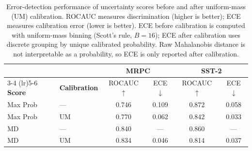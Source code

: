 \begin{table}[t]
\centering
\begin{tabular}{llcccc}
\toprule
 & & \multicolumn{2}{c}{\textbf{MRPC}} & \multicolumn{2}{c}{\textbf{SST-2 }} \\
\cmidrule(lr){3-4} \cmidrule(lr){5-6}
\textbf{Score} & \textbf{Calibration} & ROCAUC $\uparrow$ & ECE $\downarrow$ & ROCAUC $\uparrow$ & ECE $\downarrow$ \\
\midrule
Max Prob & ---  & 0.746 & 0.109 & 0.872 & 0.058 \\
Max Prob & UM   & 0.770 & 0.062 & 0.842 & 0.033 \\
\midrule
MD       & ---  & 0.840 & ---   & 0.860 & ---   \\
MD       & UM   & 0.834 & 0.046 & 0.814 & 0.037 \\
\bottomrule
\end{tabular}
\caption{Error-detection performance of uncertainty scores before and after uniform-mass (UM) calibration. ROCAUC measures discrimination (higher is better); ECE measures calibration error (lower is better). ECE before calibration is computed with uniform-mass binning (Scott's rule, $B=16$); ECE after calibration uses discrete grouping by unique calibrated probability. Raw Mahalanobis distance is not interpretable as a probability, so ECE is only reported after calibration.}
\label{tab:calibration-results}
\end{table}
